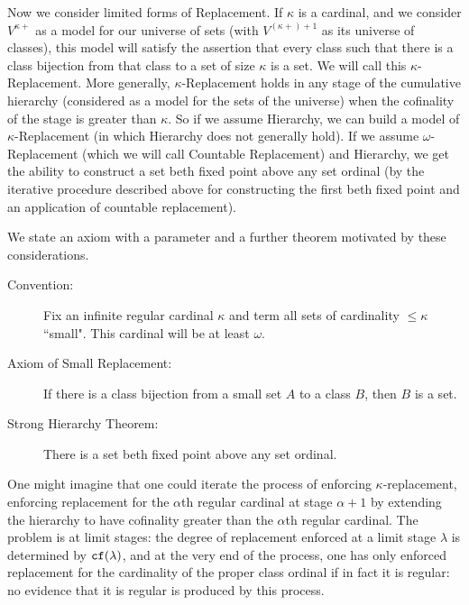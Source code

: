 \documentclass[12pt]{article}
\begin{document}
Now we consider limited forms of Replacement.  If $\kappa$ is a cardinal, and we consider $V^{\kappa+}$ as a model for our universe of sets (with $V^{(\kappa+) +1}$ as its universe of classes), this model will satisfy the assertion that every class such that there is a class bijection from that class to a set of size $\kappa$ is a set.  We will call this $\kappa$-Replacement.  More generally, $\kappa$-Replacement holds in any stage of the cumulative hierarchy (considered as a model for the sets of the universe) when the cofinality of the stage is greater than $\kappa$.  So if we assume Hierarchy, we can build a model of $\kappa$-Replacement (in which Hierarchy does not generally hold).  If we assume $\omega$-Replacement (which we will call Countable Replacement) and Hierarchy, we get the ability to construct a set beth fixed point above any set ordinal (by the iterative procedure described above for constructing the first beth fixed point and an application of countable replacement).

We state an axiom with a parameter and a further theorem motivated by these considerations.

\begin{description}

\item[Convention:]  Fix an infinite regular cardinal $\kappa$ and term all sets of cardinality $\leq \kappa$ ``small".  This cardinal will be at least $\omega$.

\item[Axiom of Small Replacement:]  If there is a class bijection from a small set $A$ to a class $B$, then $B$ is a set.

\item[Strong Hierarchy Theorem:]  There is a set beth fixed point above any set ordinal.

\end{description}

One might imagine that one could iterate the process of enforcing $\kappa$-replacement, enforcing replacement for the $\alpha$th regular cardinal at stage $\alpha+1$ by extending the hierarchy to have cofinality greater than the $\alpha$th regular cardinal.  The problem is at limit stages:
the degree of replacement enforced at a limit stage $\lambda$ is determined by ${\tt cf}(\lambda)$, and at the very end of the process, one has only enforced replacement for the cardinality of the proper class ordinal if in fact it is regular:  no evidence that it is regular is produced by this process.
\end{document}
